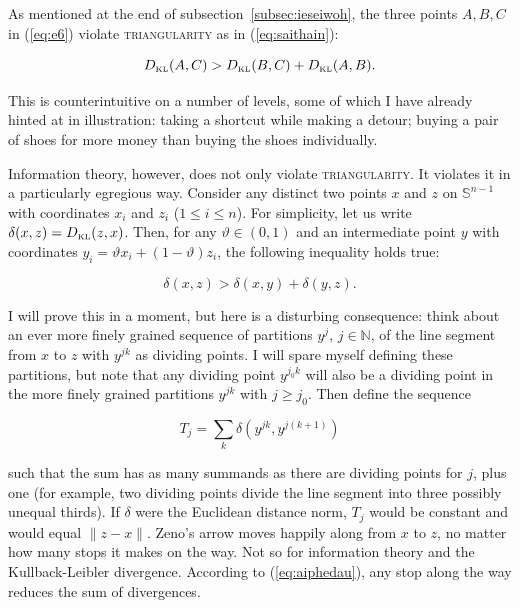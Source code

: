 \documentclass[phd,12pt,oneside]{ubcthesis}
\begin{document}
As mentioned at the end of subsection~\ref{subsec:ieseiwoh}, the three
points $A,B,C$ in (\ref{eq:e6}) violate \textsc{triangularity} as in
(\ref{eq:saithain}):

\begin{equation}
  \label{eq:yohliimo}
  D_{\mbox{\tiny KL}}(A,C)>D_{\mbox{\tiny KL}}(B,C)+D_{\mbox{\tiny KL}}(A,B).
\end{equation}

{\noindent}This is counterintuitive on a number of levels, some of which I have
already hinted at in illustration: taking a shortcut while making a
detour; buying a pair of shoes for more money than buying the shoes
individually. 

Information theory, however, does not only violate
\textsc{triangularity}. It violates it in a particularly egregious
way. Consider any distinct two points $x$ and $z$ on
$\mathbb{S}^{n-1}$ with coordinates $x_{i}$ and $z_{i}$
($1\leq{}i\leq{}n$). For simplicity, let us write
$\delta(x,z)=D_{\mbox{\tiny KL}}(z,x)$. Then, for any
$\vartheta\in{}(0,1)$ and an intermediate point $y$ with coordinates
$y_{i}=\vartheta{}x_{i}+(1-\vartheta)z_{i}$, the following inequality
holds true:

\begin{equation}
  \label{eq:aiphedau}
  \delta(x,z)>\delta\left(x,y\right)+\delta\left(y,z\right).
\end{equation}

{\noindent}I will prove this in a moment, but here is a disturbing
consequence: think about an ever more finely grained sequence of
partitions $y^{j}$, $j\in\mathbb{N}$, of the line segment from $x$ to
$z$ with $y^{jk}$ as dividing points. I will spare myself defining
these partitions, but note that any dividing point $y^{j_{0}k}$ will
also be a dividing point in the more finely grained partitions
$y^{jk}$ with $j\geq{}j_{0}$. Then define the sequence

\begin{equation}
  \label{eq:queireiw}
  T_{j}=\sum_{k}\delta\left(y^{jk},y^{j(k+1)}\right)
\end{equation}

{\noindent}such that the sum has as many summands as there are dividing points
for $j$, plus one (for example, two dividing points divide the line
segment into three possibly unequal thirds). If $\delta$ were the
Euclidean distance norm, $T_{j}$ would be constant and would equal
$\|z-x\|$. Zeno's arrow moves happily along from $x$ to $z$, no matter
how many stops it makes on the way. Not so for information theory and
the Kullback-Leibler divergence. According to (\ref{eq:aiphedau}), any
stop along the way reduces the sum of divergences.
\end{document}
